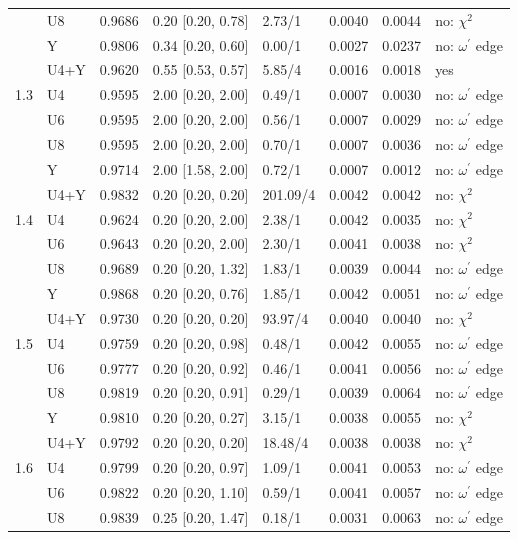 \documentclass[10pt,a4paper]{article}
\begin{document}
{\begin{longtable}{@{}llllllll@{}}
 & U8 & 0.9686 & 0.20 [0.20, 0.78] & 2.73/1 & 0.0040 & 0.0044 & no: $\chi^2$ \\
 & Y & 0.9806 & 0.34 [0.20, 0.60] & 0.00/1 & 0.0027 & 0.0237 & no: $\omega^\prime$ edge \\
 & U4+Y & 0.9620 & 0.55 [0.53, 0.57] & 5.85/4 & 0.0016 & 0.0018 & yes \\
1.3 & U4 & 0.9595 & 2.00 [0.20, 2.00] & 0.49/1 & 0.0007 & 0.0030 & no: $\omega^\prime$ edge \\
 & U6 & 0.9595 & 2.00 [0.20, 2.00] & 0.56/1 & 0.0007 & 0.0029 & no: $\omega^\prime$ edge \\
 & U8 & 0.9595 & 2.00 [0.20, 2.00] & 0.70/1 & 0.0007 & 0.0036 & no: $\omega^\prime$ edge \\
 & Y & 0.9714 & 2.00 [1.58, 2.00] & 0.72/1 & 0.0007 & 0.0012 & no: $\omega^\prime$ edge \\
 & U4+Y & 0.9832 & 0.20 [0.20, 0.20] & 201.09/4 & 0.0042 & 0.0042 & no: $\chi^2$ \\
1.4 & U4 & 0.9624 & 0.20 [0.20, 2.00] & 2.38/1 & 0.0042 & 0.0035 & no: $\chi^2$ \\
 & U6 & 0.9643 & 0.20 [0.20, 2.00] & 2.30/1 & 0.0041 & 0.0038 & no: $\chi^2$ \\
 & U8 & 0.9689 & 0.20 [0.20, 1.32] & 1.83/1 & 0.0039 & 0.0044 & no: $\omega^\prime$ edge \\
 & Y & 0.9868 & 0.20 [0.20, 0.76] & 1.85/1 & 0.0042 & 0.0051 & no: $\omega^\prime$ edge \\
 & U4+Y & 0.9730 & 0.20 [0.20, 0.20] & 93.97/4 & 0.0040 & 0.0040 & no: $\chi^2$ \\
1.5 & U4 & 0.9759 & 0.20 [0.20, 0.98] & 0.48/1 & 0.0042 & 0.0055 & no: $\omega^\prime$ edge \\
 & U6 & 0.9777 & 0.20 [0.20, 0.92] & 0.46/1 & 0.0041 & 0.0056 & no: $\omega^\prime$ edge \\
 & U8 & 0.9819 & 0.20 [0.20, 0.91] & 0.29/1 & 0.0039 & 0.0064 & no: $\omega^\prime$ edge \\
 & Y & 0.9810 & 0.20 [0.20, 0.27] & 3.15/1 & 0.0038 & 0.0055 & no: $\chi^2$ \\
 & U4+Y & 0.9792 & 0.20 [0.20, 0.20] & 18.48/4 & 0.0038 & 0.0038 & no: $\chi^2$ \\
1.6 & U4 & 0.9799 & 0.20 [0.20, 0.97] & 1.09/1 & 0.0041 & 0.0053 & no: $\omega^\prime$ edge \\
 & U6 & 0.9822 & 0.20 [0.20, 1.10] & 0.59/1 & 0.0041 & 0.0057 & no: $\omega^\prime$ edge \\
 & U8 & 0.9839 & 0.25 [0.20, 1.47] & 0.18/1 & 0.0031 & 0.0063 & no: $\omega^\prime$ edge \\

\end{longtable}}
\end{document}
